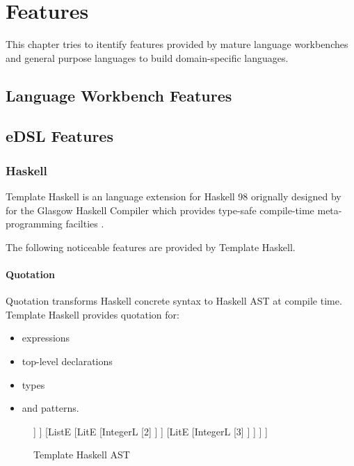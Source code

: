 \chapter{Features}

This chapter tries to itentify features provided by mature language workbenches and general purpose languages to build domain-specific languages.

\section{Language Workbench Features}


\section{eDSL Features}

\subsection{Haskell}

Template Haskell is an language extension for Haskell 98 orignally designed by \citeauthor{sheard2002template} for the Glasgow Haskell Compiler which provides type-safe compile-time meta-programming facilties \cite{sheard2002template}.

The following noticeable features are provided by Template Haskell.

\subsubsection{Quotation}

Quotation transforms Haskell concrete syntax to Haskell AST at compile time.
Template Haskell provides quotation for:
\begin{itemize}
	\item expressions
	\item top-level declarations
	\item types
	\item and patterns.
\end{itemize}


\begin{figure}[h]
	\centering
	\begin{forest}
		[TupE 
			[LitE 
				[IntegerL 
					[1]
				]
			]
			[ListE 
				[LitE 
					[IntegerL 
						[2]
					]
				]
				[LitE
					[IntegerL 
						[3]
					]
				]
			]
		]
	\end{forest}
	\caption{Template Haskell AST \label{fig:haskell/QuotedExp/ast}}
\end{figure}

